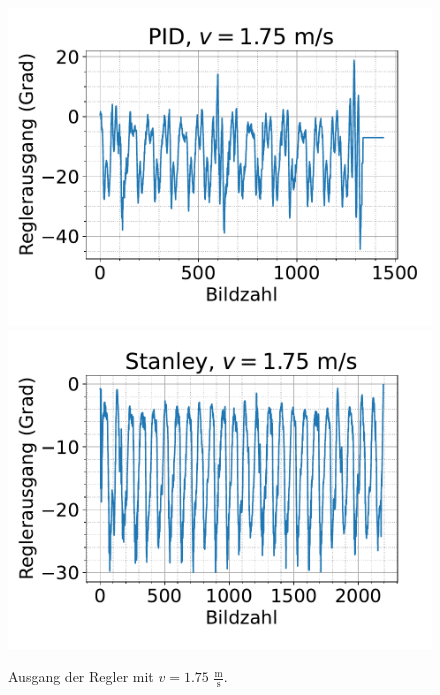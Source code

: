 \documentclass[arbeit=studie,oneside,BCOR=12mm]{ArbeitRST}
\begin{document}
\begin{figure}[h]
    \centering
    \includegraphics[scale=0.47]{pid1.75}
    \includegraphics[scale=0.47]{Stan1.75}
    \caption{Ausgang der Regler mit $v = 1.75$ $\frac{\mathrm{m}}{\mathrm{s}}$.}
    \label{reg:1.75}
\end{figure}
\end{document}
